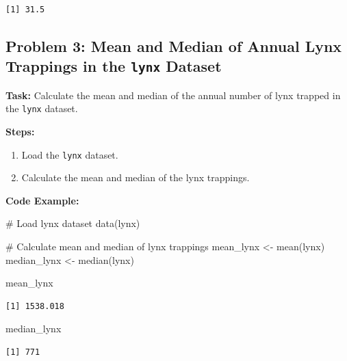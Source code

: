 \documentclass[
  letterpaper,
  DIV=11,
  numbers=noendperiod]{scrreprt}
\newenvironment{Shaded}{\begin{snugshade}}{\end{snugshade}}
\newcommand{\CommentTok}[1]{\textcolor[rgb]{0.37,0.37,0.37}{#1}}
\newcommand{\FunctionTok}[1]{\textcolor[rgb]{0.28,0.35,0.67}{#1}}
\newcommand{\NormalTok}[1]{\textcolor[rgb]{0.00,0.23,0.31}{#1}}
\newcommand{\OtherTok}[1]{\textcolor[rgb]{0.00,0.23,0.31}{#1}}
\providecommand{\tightlist}{%
  \setlength{\itemsep}{0pt}\setlength{\parskip}{0pt}}\usepackage{longtable,booktabs,array}
\begin{document}
\begin{verbatim}
[1] 31.5
\end{verbatim}

\subsection*{\texorpdfstring{Problem 3: Mean and Median of Annual Lynx
Trappings in the \texttt{lynx}
Dataset}{Problem 3: Mean and Median of Annual Lynx Trappings in the lynx Dataset}}\label{problem-3-mean-and-median-of-annual-lynx-trappings-in-the-lynx-dataset}

\textbf{Task:} Calculate the mean and median of the annual number of
lynx trapped in the \texttt{lynx} dataset.

\textbf{Steps:}

\begin{enumerate}
\def\labelenumi{\arabic{enumi}.}
\tightlist
\item
  Load the \texttt{lynx} dataset.
\item
  Calculate the mean and median of the lynx trappings.
\end{enumerate}

\textbf{Code Example:}

\begin{Shaded}
\begin{Highlighting}[]
\CommentTok{\# Load lynx dataset}
\FunctionTok{data}\NormalTok{(lynx)}

\CommentTok{\# Calculate mean and median of lynx trappings}
\NormalTok{mean\_lynx }\OtherTok{\textless{}{-}} \FunctionTok{mean}\NormalTok{(lynx)}
\NormalTok{median\_lynx }\OtherTok{\textless{}{-}} \FunctionTok{median}\NormalTok{(lynx)}

\NormalTok{mean\_lynx}
\end{Highlighting}
\end{Shaded}

\begin{verbatim}
[1] 1538.018
\end{verbatim}

\begin{Shaded}
\begin{Highlighting}[]
\NormalTok{median\_lynx}
\end{Highlighting}
\end{Shaded}

\begin{verbatim}
[1] 771
\end{verbatim}
\end{document}
